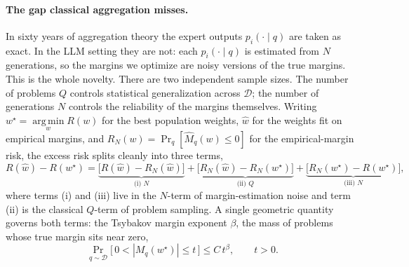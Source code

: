 \documentclass{article} %
\providecommand{\argmin}{\mathop{\mathrm{arg\,min}}\limits}
\providecommand{\D}{\mathcal{D}}
\providecommand{\Mhat}{\widehat{M}}
\providecommand{\what}{\widehat{w}}
\providecommand{\wstar}{w^{\star}}
\begin{document}
\paragraph{The gap classical aggregation misses.}
In sixty years of aggregation theory the expert outputs $p_i(\cdot\mid q)$ are
taken as exact. In the LLM setting they are not: each $p_i(\cdot\mid q)$ is
estimated from $N$ generations, so the margins we optimize are noisy versions of
the true margins. This is the whole novelty. There are two independent sample
sizes. The number of problems $Q$ controls statistical generalization across
$\D$; the number of generations $N$ controls the reliability of the margins
themselves. Writing $\wstar = \argmin_w R(w)$ for the best population weights,
$\what$ for the weights fit on empirical margins, and $R_N(w) = \Pr_q[\Mhat_q(w)\le 0]$
for the empirical-margin risk, the excess risk splits cleanly into three terms,
\begin{equation}
\label{eq:intro-decomp}
R(\what)-R(\wstar)
= \underbrace{\big[R(\what)-R_N(\what)\big]}_{\text{(i) }N}
+ \underbrace{\big[R_N(\what)-R_N(\wstar)\big]}_{\text{(ii) }Q}
+ \underbrace{\big[R_N(\wstar)-R(\wstar)\big]}_{\text{(iii) }N},
\end{equation}
where terms (i) and (iii) live in the $N$-term of margin-estimation noise and
term (ii) is the classical $Q$-term of problem sampling. A single geometric
quantity governs both terms: the Tsybakov margin exponent $\beta$, the mass of
problems whose true margin sits near zero,
\begin{equation}
\label{eq:intro-margincond}
\Pr_{q\sim\D}\big[\,0<|M_q(\wstar)|\le t\,\big] \le C\,t^{\beta}, \qquad t>0.
\end{equation}
\end{document}
